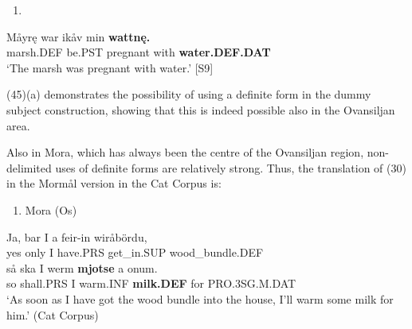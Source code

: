 \begin{enumerate} %
\item 
\end{enumerate} %
\ea\label{}
\gll Måyrę  war  ikåv  min  \textbf{wattnę.}\\


marsh.DEF  be.PST  pregnant  with  \textbf{water.DEF.DAT}\\ %


‘The marsh was pregnant with water.’ [S9]
\z

(45)(a) demonstrates the possibility of using a definite form in the dummy subject construction, showing that this is indeed possible also in the Ovansiljan area. 

Also in Mora, which has always been the centre of the Ovansiljan region, non-delimited uses of definite forms are relatively strong. Thus, the translation of (30) in the Mormål version in the Cat Corpus is:

\begin{enumerate} %
\item 
Mora (Os)

\end{enumerate} %
\ea\label{}
\gll Ja,  bar  I  a  feir-in  wiråbördu,\\


yes  only  I  have.PRS  get\_in.SUP  wood\_bundle.DEF\\ %


\ea\label{}
\gll så  ska  I  werm  \textbf{mjotse} a  onum.\\


so  shall.PRS  I  warm.INF  \textbf{milk.DEF} for  PRO.3SG.M.DAT\\ %


‘As soon as I have got the wood bundle into the house, I’ll warm some milk for him.’ (Cat Corpus)
\z


